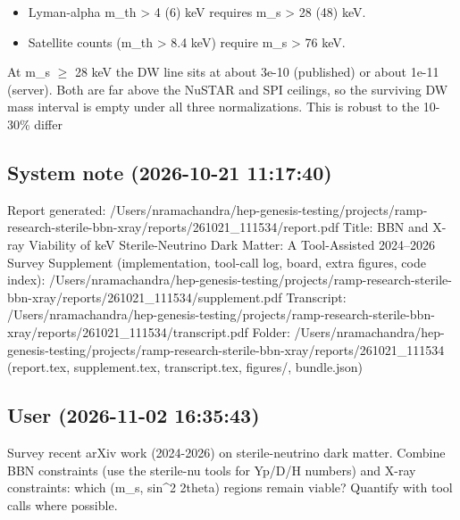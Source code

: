 \documentclass[11pt,a4paper]{article}
\begin{document}
\begin{itemize}
  \item Lyman-alpha m\_th \textgreater{} 4 (6) keV requires m\_s \textgreater{} 28 (48) keV.
  \item Satellite counts (m\_th \textgreater{} 8.4 keV) require m\_s \textgreater{} 76 keV.
\end{itemize}
At m\_s $\geq$ 28 keV the DW line sits at about 3e-10 (published) or about 1e-11 (server). Both are far above the NuSTAR and SPI ceilings, so the surviving DW mass interval is empty under all three normalizations. This is robust to the 10-30\% differ

\subsection*{System note \small(2026-10-21 11:17:40)}
Report generated: /Users/nramachandra/hep-genesis-testing/projects/ramp-research-sterile-bbn-xray/reports/261021\_111534/report.pdf Title: BBN and X-ray Viability of keV Sterile-Neutrino Dark Matter: A Tool-Assisted 2024--2026 Survey Supplement (implementation, tool-call log, board, extra figures, code index): /Users/nramachandra/hep-genesis-testing/projects/ramp-research-sterile-bbn-xray/reports/261021\_111534/supplement.pdf Transcript: /Users/nramachandra/hep-genesis-testing/projects/ramp-research-sterile-bbn-xray/reports/261021\_111534/transcript.pdf Folder: /Users/nramachandra/hep-genesis-testing/projects/ramp-research-sterile-bbn-xray/reports/261021\_111534 (report.tex, supplement.tex, transcript.tex, figures/, bundle.json)

\subsection*{User \small(2026-11-02 16:35:43)}
Survey recent arXiv work (2024-2026) on sterile-neutrino dark matter. Combine BBN constraints (use the sterile-nu tools for Yp/D/H numbers) and X-ray constraints: which (m\_s, sin\textasciicircum{}2 2theta) regions remain viable? Quantify with tool calls where possible.
\end{document}
